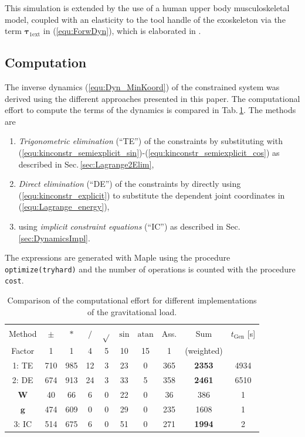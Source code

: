 \documentclass[letterpaper, 10 pt, conference]{ieeeconf}  %
\newcommand{\bm}[1]{\boldsymbol{#1}}
\begin{document}
This simulation is extended by the use of a human upper body musculoskeletal model, coupled with an elasticity to the tool handle of the exoskeleton via the term $\bm{\tau}_{1\mathrm{ext}}$ in (\ref{equ:ForwDyn}), which is elaborated in \cite{KuehnHuSchHad2018}.

\subsection{Computation}

The inverse dynamics (\ref{equ:Dyn_MinKoord}) of the constrained system was derived using the different approaches presented in this paper.
The computational effort to compute the terms of the dynamics is compared in Tab.\,\ref{tab:computation}.
The methods are 
%
\begin{enumerate}
    \item \emph{Trigonometric elimination} (``TE'') of the constraints by substituting with (\ref{equ:kinconstr_semiexplicit_sin})-(\ref{equ:kinconstr_semiexplicit_cos}) as described in Sec.\,\ref{sec:Lagrange2Elim}, 
    \item \emph{Direct elimination} (``DE'') of the constraints by directly using (\ref{equ:kinconstr_explicit}) to substitute the dependent joint coordinates in (\ref{equ:Lagrange_energy}),
    \item using \emph{implicit constraint equations} (``IC'') as described in Sec.\,\ref{sec:DynamicsImpl}.
\end{enumerate}
%
The expressions are generated with Maple using the procedure \texttt{optimize(tryhard)} and the number of operations is counted with the procedure \texttt{cost}.
%
\begin{table}
    \caption{Comparison of the computational effort for different implementations of the gravitational load.}\par\vspace{-3ex}
    \label{tab:computation}
    \centering
    \setlength\tabcolsep{3pt}
    \begin{tabular}[t]{|c|c|c|c|c|c|c|c|c|c|}
        \hline
        Method & $\pm$ & $*$ & $/$ & $\sqrt{}$ & $\mathrm{sin}$ & $\mathrm{atan}$ & Ass. & Sum & $t_\mathrm{Gen}$ [s] \\
        Factor & 1 & 1 & 4 & 5 & 10 & 15 & 1 & (weighted) & \\
        \hline
        \rowcolor{Gray}
        1: TE  & 710 & 985 & 12 & 3 & 23 & 0 & 365 & \textbf{2353} & 4934 \\
        \rowcolor{Gray}
        2: DE & 674 & 913 & 24 & 3 & 33 & 5 & 358 & \textbf{2461} & 6510 \\
        $\bm{W}$ & 40 & 66 & 6 & 0 & 22 & 0 & 36 & 386 & 1 \\
        $\bm{g}$ & 474 & 609 & 0 & 0 & 29 & 0 & 235 & 1608 & 1 \\
        \rowcolor{Gray}
        3: IC & 514 & 675 & 6 & 0 & 51 & 0 & 271 & \textbf{1994} & 2 \\
        \hline
    \end{tabular}
\end{table}
%
\end{document}
